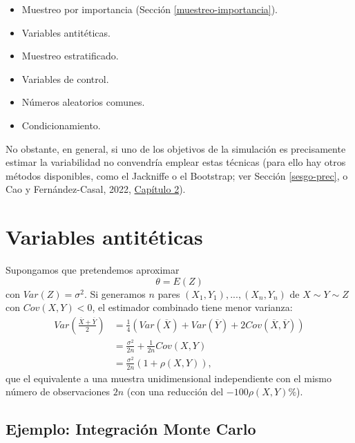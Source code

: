 \documentclass[
  10pt,
]{book}
\theoremstyle{break}
\theoremstyle{nonumberplain}
\begin{document}
\begin{itemize}
\item
  Muestreo por importancia (Sección \ref{muestreo-importancia}).
\item
  Variables antitéticas.
\item
  Muestreo estratificado.
\item
  Variables de control.
\item
  Números aleatorios comunes.
\item
  Condicionamiento.
\end{itemize}

No obstante, en general, si uno de los objetivos de la simulación es precisamente estimar la variabilidad no convendría emplear estas técnicas
(para ello hay otros métodos disponibles, como el Jackniffe o el Bootstrap; ver Sección \ref{sesgo-prec}, o Cao y Fernández-Casal, 2022, \href{https://rubenfcasal.github.io/book_remuestreo/prec-sesgo.html}{Capítulo 2}).

\hypertarget{variables-antituxe9ticas}{%
\section{Variables antitéticas}\label{variables-antituxe9ticas}}

Supongamos que pretendemos aproximar
\[\theta=E\left(  Z\right)\]
con \(Var\left( Z \right) = \sigma^{2}\).
Si generamos \(n\) pares
\(\left( X_{1},Y_{1}\right), ... ,\left( X_{n},Y_{n}\right)\)
de \(X\sim Y\sim Z\) con \(Cov\left( X,Y\right) < 0\),
el estimador combinado tiene menor varianza:
\[\begin{aligned}
    Var\left(  \frac{\overline{X}+\overline{Y}}{2}\right)   & =\frac{1}{4}\left(
    Var\left(  \overline{X}\right)  +Var\left(  \overline{Y}\right)  +2Cov\left(
    \overline{X},\overline{Y}\right)  \right) \\
    & =\frac{\sigma^{2}}{2n}+\frac{1}{2n}Cov\left(  X,Y\right) \\
    & =\frac{\sigma^{2}}{2n}\left(  1+\rho \left(  X,Y\right)  \right),
\end{aligned}\]
que el equivalente a una muestra unidimensional independiente con el
mismo número de observaciones \(2n\) (con una reducción del
\(-100\rho \left( X,Y\right) \%\)).

\hypertarget{ejemplo-integraciuxf3n-monte-carlo}{%
\subsection{Ejemplo: Integración Monte Carlo}\label{ejemplo-integraciuxf3n-monte-carlo}}
\end{document}
